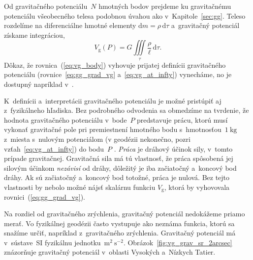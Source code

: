 \documentclass[a4paper, 12pt]{book}
\newcommand{\diff}{\mathrm d}
\newcommand{\gidx}{\mathrm g}
\begin{document}
Od gravitačného potenciálu~$N$ hmotných bodov prejdeme ku
gravitačnému potenciálu všeobecného telesa podobnou úvahou ako
v~Kapitole~\ref{sec:gg}.  Teleso rozdelíme na diferenciálne hmotné elementy
$\diff m = \rho \, \diff \tau$ a~gravitačný potenciál získame integráciou,
%
\begin{equation}
\label{eq:vg_body}
V_\gidx(P) = G \iiint\limits_{\tau} \frac{\rho}{\ell} \, \diff\tau{.}
\end{equation}
%
Dôkaz, že rovnica~(\ref{eq:vg_body}) vyhovuje prijatej definícii gravitačného
potenciálu (rovnice~\ref{eq:gg_grad_vg} a~\ref{eq:vg_at_infty}) vynecháme, no 
je
dostupný napríklad v~\textcite{MacMillan1930}.

K~definícii a~interpretácii gravitačného potenciálu je možné pristúpiť aj 
z~fyzikálneho hľadiska.  Bez podrobného odvodenia sa obmedzíme na tvrdenie, že 
hodnota gravitačného potenciálu v~bode~$P$ predstavuje prácu, ktorú musí 
vykonať gravitačné pole pri premiestnení hmotného bodu s~hmotnosťou~$1\ 
\mathrm{kg}$ z~miesta s~nulovým potenciálom (v geodézii nekonečno, pozri 
vzťah~\ref{eq:vg_at_infty}) do bodu~$P$ 
\parencite{MacMillan1930,Kellogg1967,TorgeGeodesy}.  \emph{Práca} je dráhový 
účinok sily, v~tomto prípade gravitačnej.  Gravitačná sila má tú vlastnosť, že 
práca spôsobená jej silovým účinkom \emph{nezávisí} od dráhy, dôležitý je iba 
začiatočný a~koncový bod dráhy.  Ak sú začiatočný a~koncový bod totožné, práca 
je nulová.  Bez tejto vlastnosti by nebolo možné nájsť skalárnu funkciu 
$V_\gidx$, ktorá by vyhovovala rovnici~(\ref{eq:gg_grad_vg}).

Na rozdiel od gravitačného zrýchlenia, gravitačný potenciál nedokážeme
priamo merať.  Vo fyzikálnej geodézii často vystupuje ako neznáma funkcia,
ktorú sa snažíme určiť, napríklad z~gravitačného zrýchlenia.  Gravitačný 
potenciál má v~sústave~SI fyzikálnu jednotku~$\mathrm{m}^2\ \mathrm{s}^{-2}$.
Obrázok~\ref{fig:vg_grav_sr_2arcsec} znázorňuje gravitačný potenciál v~oblasti 
Vysokých a~Nízkych Tatier.
\end{document}
